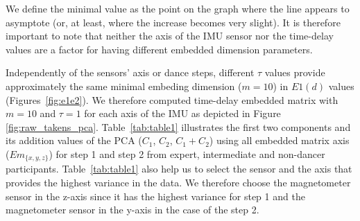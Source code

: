 \documentclass{sigchi}
\begin{document}
  

  
We define the minimal value as the point on the graph where the 
line appears to asymptote (or, at least, where the increase becomes very slight). 
It is therefore important to note that neither the axis of the IMU sensor nor the time-delay values 
are a factor for having different embedded dimension parameters.


Independently of the sensors' axis or dance steps, different $\tau$ values provide approximately the 
same minimal embeding dimension ($m=10$) in $E1(d)$ values (Figures~\ref{fig:e1e2}).
We therefore computed time-delay embedded matrix with $m=10$ and $\tau = 1$ 
for each axis of the IMU as depicted in Figure \ref{fig:raw_takens_pca}.
Table~\ref{tab:table1} illustrates the first two components and its addition values of the PCA ($C_1$, $C_2$, $C_1+ C_2$)
using all embedded matrix axis ($Em_{\{ x,y,z \}}$) for step 1 and step 2 from expert, 
intermediate and non-dancer participants.
Table~\ref{tab:table1} also help us to select the sensor and the axis that 
provides the highest variance in the data.
We therefore choose the magnetometer sensor in the z-axis since it has the highest variance for step 1
and the magnetometer sensor in the y-axis in the case of the step 2.
\end{document}
